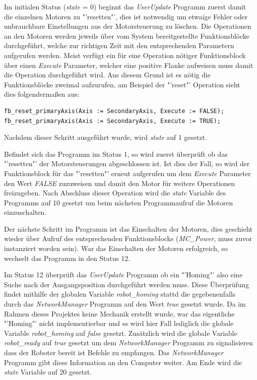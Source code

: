 Im initialen Status (\textit{state} = 0) beginnt das \textit{UserUpdate} Programm zuerst damit die einzelnen Motoren zu "'resetten"', dies ist notwendig um etwaige Fehler oder unbrauchbare Einstellungen aus der Motorsteuerung zu löschen. Die Operationen an den Motoren werden jeweils über vom System bereitgestellte Funktionsblöcke durchgeführt, welche zur richtigen Zeit mit den entsprechenden Parametern aufgerufen werden. Meist verfügt ein für eine Operation nötiger Funktionsblock über einen \textit{Execute} Parameter, welcher eine positive Flanke aufweisen muss damit die Operation durchgeführt wird. Aus diesem Grund ist es nötig die Funktionsblöcke zweimal aufzurufen, am Beispiel der "'reset"' Operation sieht dies folgendermaßen aus:
\begin{lstlisting}[language = codesysls, captionpos=b, caption={Resetten einer Motors}]
fb_reset_primaryAxis(Axis := SecondaryAxis, Execute := FALSE);
fb_reset_primaryAxis(Axis := SecondaryAxis, Execute := TRUE);
\end{lstlisting}

Nachdem dieser Schritt ausgeführt wurde, wird \textit{state} auf 1 gesetzt. 

Befindet sich das Programm im Status 1, so wird zuerst überprüft ob das "'resetten"' der Motorsteuerungen abgeschlossen ist. Ist dies der Fall, so wird der Funktionsblock für das "'resetten"' erneut aufgerufen um dem \textit{Execute} Parameter den Wert \textit{FALSE} zuzuweisen und damit den Motor für weitere Operationen freizugeben.
Nach Abschluss dieser Operation wird die \textit{state} Variable des Programms auf 10 gesetzt um beim nächsten Programmaufruf die Motoren einzuschalten.

Der nächste Schritt im Programm ist das Einschalten der Motoren, dies geschieht wieder über Aufruf des entsprechenden Funktionsblocks (\textit{MC\_Power}, muss zuvor instanziert worden sein). War das Einschalten der Motoren erfolgreich, so wechselt das Programm in den Status 12.

Im Status 12 überprüft das \textit{UserUpdate} Programm ob ein "'Homing"' also eine Suche nach der Ausgangsposition durchgeführt werden muss. Diese Überprüfung findet mithilfe der globalen Variable \textit{robot\_homing} stattd die gegebenenfalls durch das \textit{NetworkManager} Programm auf den Wert \textit{true} gesetzt wurde.
Da im Rahmen dieses Projektes keine Mechanik erstellt wurde, war das eigentliche "'Homing"' nicht implementierbar und es wird hier Fall lediglich die globale Variable \textit{robot\_homing} auf \textit{false} gesetzt. Zusätzlich wird die globale Variable \textit{robot\_ready} auf \textit{true} gesetzt um dem \textit{NetworkManager} Programm zu signalisieren dass der Roboter bereit ist Befehle zu empfangen. Das \textit{NetworkManager} Programm gibt diese Information an den Computer weiter. Am Ende wird die \textit{state} Variable auf 20 gesetzt.

